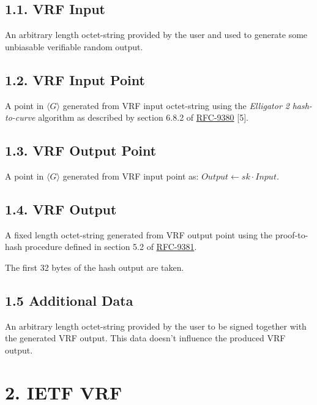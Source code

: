 \documentclass[
]{article}
\begin{document}
\hypertarget{vrf-input}{%
\subsection{1.1. VRF Input}\label{vrf-input}}

An arbitrary length octet-string provided by the user and used to
generate some unbiasable verifiable random output.

\hypertarget{vrf-input-point}{%
\subsection{1.2. VRF Input Point}\label{vrf-input-point}}

A point in \(\langle G \rangle\) generated from VRF input octet-string
using the \emph{Elligator 2} \emph{hash-to-curve} algorithm as described
by section 6.8.2 of
\href{https://datatracker.ietf.org/doc/rfc9380}{RFC-9380} {[}5{]}.

\hypertarget{vrf-output-point}{%
\subsection{1.3. VRF Output Point}\label{vrf-output-point}}

A point in \(\langle G \rangle\) generated from VRF input point as:
\(Output \leftarrow sk \cdot Input\).

\hypertarget{vrf-output}{%
\subsection{1.4. VRF Output}\label{vrf-output}}

A fixed length octet-string generated from VRF output point using the
proof-to-hash procedure defined in section 5.2 of
\href{https://datatracker.ietf.org/doc/rfc9381}{RFC-9381}.

The first 32 bytes of the hash output are taken.

\hypertarget{additional-data}{%
\subsection{1.5 Additional Data}\label{additional-data}}

An arbitrary length octet-string provided by the user to be signed
together with the generated VRF output. This data doesn't influence the
produced VRF output.

\hypertarget{ietf-vrf}{%
\section{2. IETF VRF}\label{ietf-vrf}}
\end{document}
